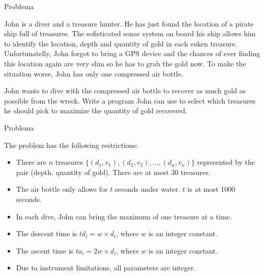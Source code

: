 
\begin{frame}[fragile]{Problema}

John is a diver and a treasure hunter. He has just found the location of a pirate ship full of 
treasures.  The sofisticated sonar system on board his ship allows him to identify the 
location, depth and quantity of gold in each suken treasure. Unfortunatelly, John forgot to 
bring a GPS device and the chances of ever finding this location again are very slim so he has 
to grab the gold now. To make the situation worse, John has only one compressed air bottle.

John wants to dive with the compressed air bottle to recover as much gold as possible from the
wreck. Write a program John can use to select which treasures he should pick to maximize the 
quantity of gold recovered.

\end{frame}

\begin{frame}[fragile]{Problema}

    The problem has the following restrictions: 

    \begin{itemize}
        \item There are $n$ treasures $\{(d_1, v_1),(d_2, v_2), \ldots, (d_n, v_n)\}$
            represented by the pair (depth, quantity of gold). There are at most 30 treasures.

        \item The air bottle only allows for $t$ seconds under water. $t$ is at most 1000 
            seconds.

        \item In each dive, John can bring the maximum of one treasure at a time.

        \item The descent time is $td_i = w \times d_i$, where $w$ is an integer constant.

        \item The ascent time is $ta_i = 2w \times d_i$, where $w$ is an integer constant.

        \item Due to instrument limitations, all parameters are integer.
    \end{itemize}

\end{frame}

